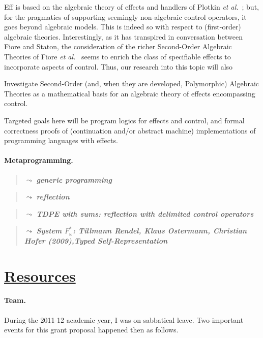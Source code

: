 \documentclass[11pt,twocolumn]{article}
\newcounter{CC}
\newenvironment{resenumerate}
  {\begin{list}{[\textbf{\arabic{CC}]}}
  {\usecounter{CC}
   \setlength{\topsep}{2pt}
   \setlength{\partopsep}{2pt}
   \setlength{\itemsep}{2.5pt}
   \setlength{\parsep}{2.5pt}
   \setlength{\leftmargin}{1.65em}
   \setlength{\labelwidth}{1.15em}
 }}
  {\end{list}}
\newcommand{\hide}[1]{}
\newcommand{\note}[1]%
{\begin{quote}{\color{blue}$\leadsto$ \bf\em #1}\end{quote}}
\newcommand{\hidenote}{\hide}
\newcommand{\etal}{\emph{et al.}}
\newcommand{\SystemL}{\mbox{System~$L$}}
\begin{document}
Eff is based on the algebraic theory of effects and handlers of Plotkin
\etal~\cite{PlotkinPowerAlgOpsAndGenEffs,PlotkinPretnar};
but, for the pragmatics of supporting seemingly non-algebraic control
operators, it goes beyond algebraic models.  This is indeed so with
respect to (first-order) algebraic theories.  Interestingly, as it has
transpired in conversation between Fiore and Staton, the consideration of
the richer Second-Order Algebraic Theories of Fiore
\etal~\cite{FioreHur,FioreMahmoud} seems to enrich the class of
specifiable effects to incorporate aspects of control.  Thus, our research
into this topic will also
\begin{resenumerate}\setcounter{CC}{5}
\item
  Investigate Second-Order (and, when they are developed, Polymorphic)
  Algebraic Theories as a mathematical basis for an algebraic theory of
  effects encompassing control.
\end{resenumerate}
Targeted goals here will be program logics for effects and control, and formal
correctness proofs of (continuation and/or abstract machine) implementations
of programming languages with effects.

\hidenote{Dependent CBPV}

\paragraph{Metaprogramming.}
\label{MetaprogrammingParagraph}

\note{generic programming}

\note{reflection}

\note{TDPE with sums: reflection with delimited control operators}

\note{System $F_\omega^*$: Tillmann Rendel, Klaus Ostermann, Christian
  Hofer (2009),Typed Self-Representation}

\hidenote{\SystemL internalisation of stacks?}

\hidenote{ssreflect?}

\section{\underline{Resources}}
\label{ResourcesSection}

\paragraph*{Team.}

During the 2011-12 academic year, I was on sabbatical leave.  Two important
events for this grant proposal happened then as follows.  
\end{document}
